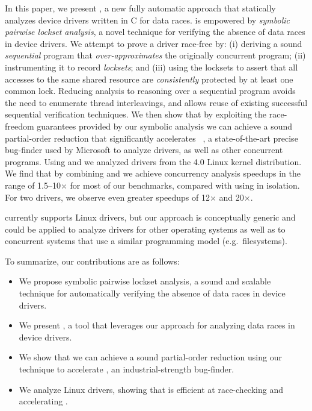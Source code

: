 In this paper, we present \whoop, a new fully automatic approach that statically analyzes device drivers written in C for data races. \whoop is empowered by \emph{symbolic pairwise lockset analysis}, a novel technique for verifying the absence of data races in device drivers. We attempt to prove a driver race-free by: (i) deriving a sound \emph{sequential} program that \emph{over-approximates} the originally concurrent program; (ii) instrumenting it to record \emph{locksets}; and (iii) using the locksets to assert that all accesses to the same shared resource are \emph{consistently} protected by at least one common lock. Reducing analysis to reasoning over a sequential program avoids the need to enumerate thread interleavings, and allows reuse of existing successful sequential verification techniques.
%
We then show that by exploiting the race-freedom guarantees provided by our symbolic analysis we can achieve a sound partial-order reduction that significantly accelerates \corral~\cite{lal2012corral}, a state-of-the-art precise bug-finder used by Microsoft to analyze drivers, as well as other concurrent programs. Using \whoop and \corral we analyzed \sizeOfBenchmarks drivers from the 4.0 Linux kernel distribution.  We find that by combining \whoop and \corral we achieve concurrency analysis speedups in the range of 1.5--10$\times$ for most of our benchmarks, compared with using \corral in isolation.  For two drivers, we observe even greater speedups of 12$\times$ and 20$\times$.

\whoop currently supports Linux drivers, but our approach is conceptually generic and could be applied to analyze drivers for other operating systems as well as to concurrent systems that use a similar programming model (e.g.\ filesystems).

To summarize, our contributions are as follows:
\begin{itemize}
\item We propose symbolic pairwise lockset analysis, a sound and scalable technique for automatically verifying the absence of data races in device drivers.
\item We present \whoop, a tool that leverages our approach for analyzing data races in device drivers.
\item We show that we can achieve a sound partial-order reduction using our technique to accelerate \corral, an industrial-strength bug-finder.
\item We analyze \sizeOfBenchmarks Linux drivers, showing that \whoop is efficient at race-checking and accelerating \corral.
\end{itemize}
